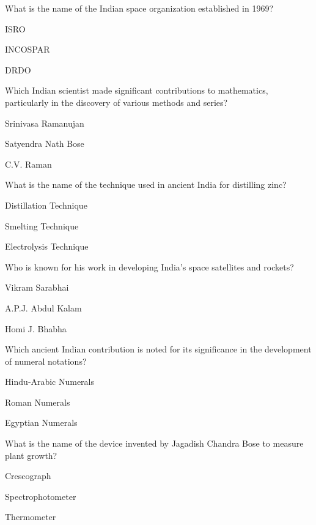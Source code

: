 \begin{enhancedmcq}{What is the name of the Indian space organization established in 1969?}
\item ISRO
\item INCOSPAR
\item DRDO

\end{enhancedmcq}
\begin{enhancedmcq}{Which Indian scientist made significant contributions to mathematics, particularly in the discovery of various methods and series?}
\item Srinivasa Ramanujan
\item Satyendra Nath Bose
\item C.V. Raman

\end{enhancedmcq}
\begin{enhancedmcq}{What is the name of the technique used in ancient India for distilling zinc?}
\item Distillation Technique
\item Smelting Technique
\item Electrolysis Technique

\end{enhancedmcq}
\begin{enhancedmcq}{Who is known for his work in developing India's space satellites and rockets?}
\item Vikram Sarabhai
\item A.P.J. Abdul Kalam
\item Homi J. Bhabha

\end{enhancedmcq}
\begin{enhancedmcq}{Which ancient Indian contribution is noted for its significance in the development of numeral notations?}
\item Hindu‑Arabic Numerals
\item Roman Numerals
\item Egyptian Numerals

\end{enhancedmcq}
\begin{enhancedmcq}{What is the name of the device invented by Jagadish Chandra Bose to measure plant growth?}
\item Crescograph
\item Spectrophotometer
\item Thermometer

\end{enhancedmcq}
